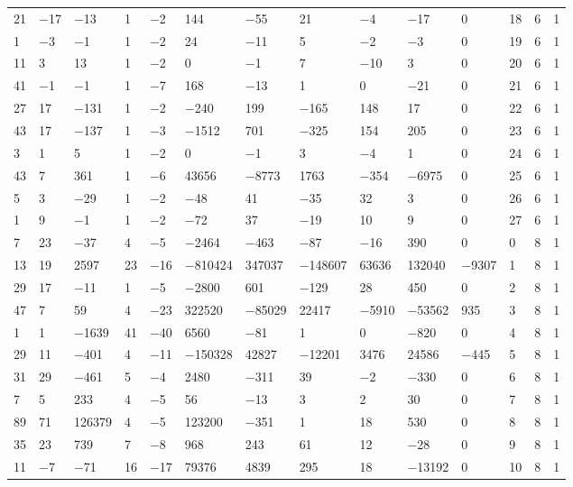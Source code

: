 \documentclass[10pt,a4paper]{amsart}
\numberwithin{equation}{section}
\theoremstyle{definition}
\numberwithin{table}{section}
\begin{document}
{\begin{paracol}{3}
\begin{supertabular}{|w{c}{.32cm}w{c}{.32cm}w{c}{.32cm}@{\hspace{.5cm}}w{c}{.2cm}w{c}{.2cm}|@{\hspace{\tabcolsep}}HHHHHHw{c}{.17cm}w{c}{.17cm}w{c}{.17cm}|}
			21 & $-$17 & $-$13 & 1 & $-$2 & 144 & $-$55 & 21 & $-$4 & $-$17 & 0 & 18 & 6 & 1 \\
			1 & $-$3 & $-$1 & 1 & $-$2 & 24 & $-$11 & 5 & $-$2 & $-$3 & 0 & 19 & 6 & 1 \\
			11 & 3 & 13 & 1 & $-$2 & 0 & $-$1 & 7 & $-$10 & 3 & 0 & 20 & 6 & 1 \\
			41 & $-$1 & $-$1 & 1 & $-$7 & 168 & $-$13 & 1 & 0 & $-$21 & 0 & 21 & 6 & 1 \\
			27 & 17 & $-$131 & 1 & $-$2 & $-$240 & 199 & $-$165 & 148 & 17 & 0 & 22 & 6 & 1 \\
			43 & 17 & $-$137 & 1 & $-$3 & $-$1512 & 701 & $-$325 & 154 & 205 & 0 & 23 & 6 & 1 \\
			3 & 1 & 5 & 1 & $-$2 & 0 & $-$1 & 3 & $-$4 & 1 & 0 & 24 & 6 & 1 \\
			43 & 7 & 361 & 1 & $-$6 & 43656 & $-$8773 & 1763 & $-$354 & $-$6975 & 0 & 25 & 6 & 1 \\
			5 & 3 & $-$29 & 1 & $-$2 & $-$48 & 41 & $-$35 & 32 & 3 & 0 & 26 & 6 & 1 \\
			1 & 9 & $-$1 & 1 & $-$2 & $-$72 & 37 & $-$19 & 10 & 9 & 0 & 27 & 6 & 1 \\
			7 & 23 & $-$37 & 4 & $-$5 & $-$2464 & $-$463 & $-$87 & $-$16 & 390 & 0 & 0 & 8 & 1 \\
			13 & 19 & 2597 & 23 & $-$16 & $-$810424 & 347037 & $-$148607 & 63636 & 132040 & $-$9307 & 1 & 8 & 1 \\
			29 & 17 & $-$11 & 1 & $-$5 & $-$2800 & 601 & $-$129 & 28 & 450 & 0 & 2 & 8 & 1 \\
			47 & 7 & 59 & 4 & $-$23 & 322520 & $-$85029 & 22417 & $-$5910 & $-$53562 & 935 & 3 & 8 & 1 \\
			1 & 1 & $-$1639 & 41 & $-$40 & 6560 & $-$81 & 1 & 0 & $-$820 & 0 & 4 & 8 & 1 \\
			29 & 11 & $-$401 & 4 & $-$11 & $-$150328 & 42827 & $-$12201 & 3476 & 24586 & $-$445 & 5 & 8 & 1 \\
			31 & 29 & $-$461 & 5 & $-$4 & 2480 & $-$311 & 39 & $-$2 & $-$330 & 0 & 6 & 8 & 1 \\
			7 & 5 & 233 & 4 & $-$5 & 56 & $-$13 & 3 & 2 & 30 & 0 & 7 & 8 & 1 \\
			89 & 71 & 126379 & 4 & $-$5 & 123200 & $-$351 & 1 & 18 & 530 & 0 & 8 & 8 & 1 \\
			35 & 23 & 739 & 7 & $-$8 & 968 & 243 & 61 & 12 & $-$28 & 0 & 9 & 8 & 1 \\
			11 & $-$7 & $-$71 & 16 & $-$17 & 79376 & 4839 & 295 & 18 & $-$13192 & 0 & 10 & 8 & 1 \\

\end{supertabular}
\end{paracol}}
\end{document}
